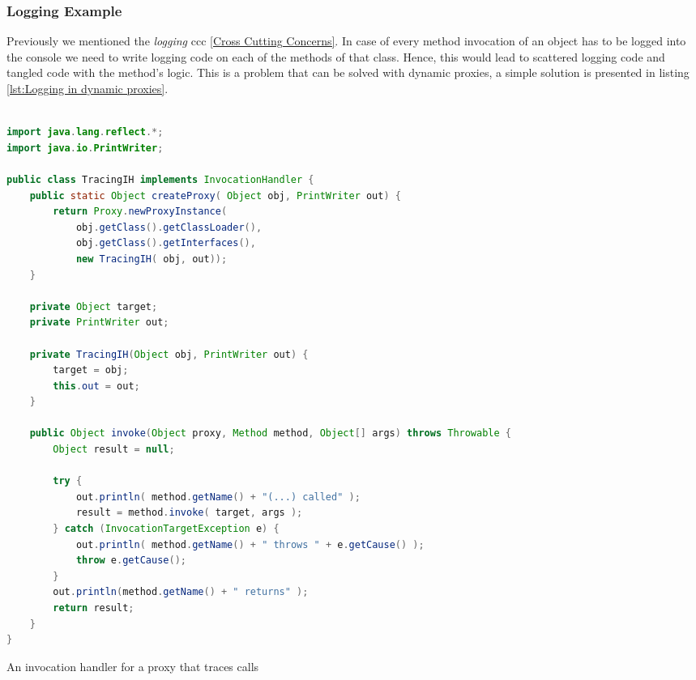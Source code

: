 \subsubsection{Logging Example}
Previously we mentioned the \textit{logging} \ac{ccc} \ref{Cross Cutting Concerns}.
In case of every method invocation of an object has to be logged into the console we need to write logging code on each of the methods of that class.
Hence, this would lead to scattered logging code and tangled code with the method's logic.
This is a problem that can be solved with dynamic proxies, a simple solution is presented in listing \ref{lst:Logging in dynamic proxies}.

\begin{sourcecode}
	\label{lst:Logging in dynamic proxies}
	\begin{lstlisting}[language=Java]

import java.lang.reflect.*;
import java.io.PrintWriter;

public class TracingIH implements InvocationHandler {
    public static Object createProxy( Object obj, PrintWriter out) {
        return Proxy.newProxyInstance(
            obj.getClass().getClassLoader(),
            obj.getClass().getInterfaces(),
            new TracingIH( obj, out));
    }

    private Object target;
    private PrintWriter out;

    private TracingIH(Object obj, PrintWriter out) {
        target = obj;
        this.out = out;
    }

    public Object invoke(Object proxy, Method method, Object[] args) throws Throwable {
        Object result = null;

        try {
            out.println( method.getName() + "(...) called" );
            result = method.invoke( target, args );
        } catch (InvocationTargetException e) {
            out.println( method.getName() + " throws " + e.getCause() );
            throw e.getCause();
        }
        out.println(method.getName() + " returns" );
        return result;
    }
}	

	\end{lstlisting}
	\caption{An invocation handler for a proxy that traces calls \cite{forman2004java}}
\end{sourcecode}

